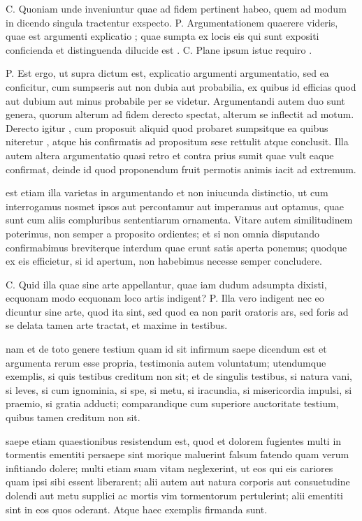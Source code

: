  C. Quoniam unde inveniuntur quae ad fidem pertinent habeo, quem ad modum in dicendo singula tractentur exspecto. P. Argumentationem quaerere videris, quae est argumenti explicatio ; quae sumpta ex locis eis qui sunt expositi conficienda et distinguenda dilucide est . C. Plane ipsum istuc requiro .

 P. Est ergo, ut supra dictum est, explicatio argumenti argumentatio, sed ea conficitur, cum sumpseris aut non dubia aut probabilia, ex quibus id efficias quod aut dubium aut minus probabile per se videtur. Argumentandi autem duo sunt genera, quorum alterum ad fidem derecto spectat, alterum se inflectit ad motum. Derecto igitur , cum proposuit aliquid quod probaret sumpsitque ea quibus niteretur , atque his confirmatis ad propositum sese rettulit atque conclusit. Illa autem altera argumentatio quasi retro et contra prius sumit quae vult eaque confirmat, deinde id quod proponendum fruit permotis animis iacit ad extremum.

 est etiam illa varietas in argumentando et non iniucunda distinctio, ut cum interrogamus nosmet ipsos aut percontamur aut imperamus aut optamus, quae sunt cum aliis compluribus sententiarum ornamenta. Vitare autem similitudinem poterimus, non semper a proposito ordientes; et si non omnia disputando confirmabimus breviterque interdum quae erunt satis aperta ponemus; quodque ex eis efficietur, si id apertum, non habebimus necesse semper concludere.

 C. Quid illa quae sine arte appellantur, quae iam dudum adsumpta dixisti, ecquonam modo ecquonam loco artis indigent? P. Illa vero indigent nec eo dicuntur sine arte, quod ita sint, sed quod ea non parit oratoris ars, sed foris ad se delata tamen arte tractat, et maxime in testibus.

 nam et de toto genere testium quam id sit infirmum saepe dicendum est et argumenta rerum esse propria, testimonia autem voluntatum; utendumque exemplis, si quis testibus creditum non sit; et de singulis testibus, si natura vani, si leves, si cum ignominia, si spe, si metu, si iracundia, si misericordia impulsi, si praemio, si gratia adducti; comparandique cum superiore auctoritate testium, quibus tamen creditum non sit.

 saepe etiam quaestionibus resistendum est, quod et dolorem fugientes multi in tormentis ementiti persaepe sint morique maluerint falsum fatendo quam verum infitiando dolere; multi etiam suam vitam neglexerint, ut eos qui eis cariores quam ipsi sibi essent liberarent; alii autem aut natura corporis aut consuetudine dolendi aut metu supplici ac mortis vim tormentorum pertulerint; alii ementiti sint in eos quos oderant. Atque haec exemplis firmanda sunt.


